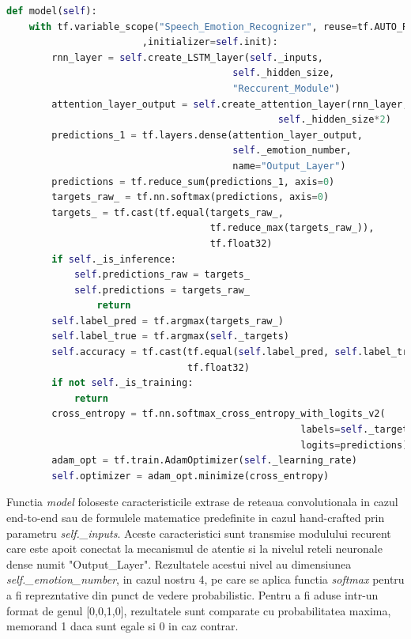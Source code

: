 \documentclass[a4paper,12pt]{book}
\begin{document}
		\begin{lstlisting}[language=Python, caption={Functia care creaza graficul de executie Tensorflow, conectand toate componentele de procesare ale sistemului SER.}]	
def model(self):
	with tf.variable_scope("Speech_Emotion_Recognizer", reuse=tf.AUTO_REUSE
						,initializer=self.init):
		rnn_layer = self.create_LSTM_layer(self._inputs, 
										self._hidden_size, 
										"Reccurent_Module")		
		attention_layer_output = self.create_attention_layer(rnn_layer, 
												self._hidden_size*2)
		predictions_1 = tf.layers.dense(attention_layer_output, 
										self._emotion_number, 
										name="Output_Layer")
		predictions = tf.reduce_sum(predictions_1, axis=0)		
		targets_raw_ = tf.nn.softmax(predictions, axis=0)		
		targets_ = tf.cast(tf.equal(targets_raw_, 
									tf.reduce_max(targets_raw_)), 
									tf.float32)
		if self._is_inference:
			self.predictions_raw = targets_
			self.predictions = targets_raw_
				return					
		self.label_pred = tf.argmax(targets_raw_)
		self.label_true = tf.argmax(self._targets)		
		self.accuracy = tf.cast(tf.equal(self.label_pred, self.label_true),
								tf.float32)
		if not self._is_training:
			return
		cross_entropy = tf.nn.softmax_cross_entropy_with_logits_v2(
													labels=self._targets, 
													logits=predictions)	
		adam_opt = tf.train.AdamOptimizer(self._learning_rate)
		self.optimizer = adam_opt.minimize(cross_entropy)	\end{lstlisting}
		Functia \textit{model} foloseste caracteristicile extrase de reteaua convolutionala in cazul end-to-end sau de formulele matematice predefinite in cazul hand-crafted prin parametru \textit{self.\_inputs}. Aceste caracteristici sunt transmise modulului recurent care este apoit conectat la mecanismul de atentie si la nivelul reteli neuronale dense numit "Output\_Layer". Rezultatele acestui nivel au dimensiunea \textit{self.\_emotion\_number}, in cazul nostru 4, pe care se aplica functia \textit{softmax} pentru a fi reprezntative din punct de vedere probabilistic. Pentru a fi aduse intr-un format de genul [0,0,1,0], rezultatele sunt comparate cu probabilitatea maxima, memorand 1 daca sunt egale si 0 in caz contrar. \par
		
\end{document}
